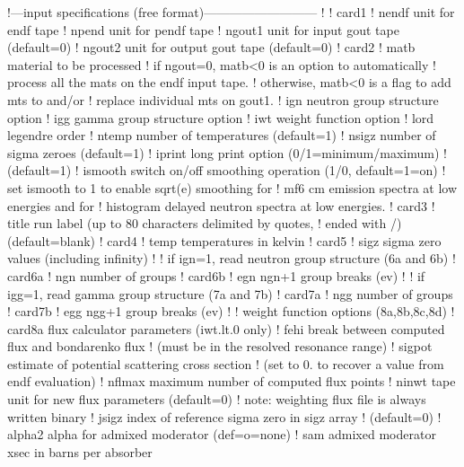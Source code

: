 \small
\begin{ccode}

   !---input specifications (free format)---------------------------
   !
   ! card1
   !    nendf   unit for endf tape
   !    npend   unit for pendf tape
   !    ngout1  unit for input gout tape (default=0)
   !    ngout2  unit for output gout tape (default=0)
   ! card2
   !    matb    material to be processed
   !             if ngout=0, matb<0 is an option to automatically
   !              process all the mats on the endf input tape.
   !             otherwise, matb<0 is a flag to add mts to and/or
   !              replace individual mts on gout1.
   !    ign     neutron group structure option
   !    igg     gamma group structure option
   !    iwt     weight function option
   !    lord    legendre order
   !    ntemp   number of temperatures (default=1)
   !    nsigz   number of sigma zeroes (default=1)
   !    iprint  long print option (0/1=minimum/maximum)
   !            (default=1)
   !    ismooth switch on/off smoothing operation (1/0, default=1=on)
   !            set ismooth to 1 to enable sqrt(e) smoothing for
   !            mf6 cm emission spectra at low energies and for
   !            histogram delayed neutron spectra at low energies.
   ! card3
   !    title   run label (up to 80 characters delimited by quotes,
   !            ended with /)  (default=blank)
   ! card4
   !    temp    temperatures in kelvin
   ! card5
   !    sigz    sigma zero values (including infinity)
   !
   !          if ign=1, read neutron group structure (6a and 6b)
   ! card6a
   !    ngn     number of groups
   ! card6b
   !    egn     ngn+1 group breaks (ev)
   !
   !          if igg=1, read gamma group structure (7a and 7b)
   ! card7a
   !    ngg     number of groups
   ! card7b
   !    egg     ngg+1 group breaks (ev)
   !
   !          weight function options (8a,8b,8c,8d)
   ! card8a     flux calculator parameters (iwt.lt.0 only)
   !    fehi    break between computed flux and bondarenko flux
   !            (must be in the resolved resonance range)
   !    sigpot  estimate of potential scattering cross section
   !            (set to 0. to recover a value from endf evaluation)
   !    nflmax  maximum number of computed flux points
   !    ninwt   tape unit for new flux parameters (default=0)
   !            note: weighting flux file is always written binary
   !    jsigz   index of reference sigma zero in sigz array
   !            (default=0)
   !    alpha2   alpha for admixed moderator (def=o=none)
   !    sam      admixed moderator xsec in barns per absorber

\end{ccode}
